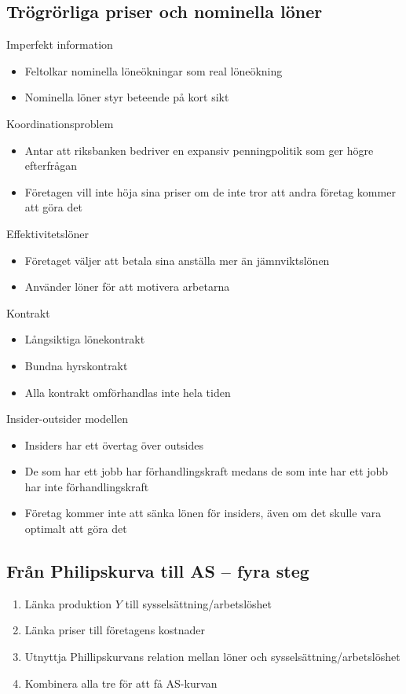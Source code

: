 \documentclass[12pt,a4paper]{article}
\begin{document}
\subsection{Trögrörliga priser och nominella löner}
Imperfekt information
\begin{itemize}
    \item Feltolkar nominella löneökningar som real löneökning
    \item Nominella löner styr beteende på kort sikt 
\end{itemize}

\noindent Koordinationsproblem
\begin{itemize}
    \item Antar att riksbanken bedriver en expansiv penningpolitik som ger högre efterfrågan 
    \item Företagen vill inte höja sina priser om de inte tror att andra företag kommer att göra det
\end{itemize}

\noindent Effektivitetslöner
\begin{itemize}
    \item Företaget väljer att betala sina anställa mer än jämnviktslönen 
    \item Använder löner för att motivera arbetarna
\end{itemize}

\noindent Kontrakt 
\begin{itemize}
    \item Långsiktiga lönekontrakt
    \item Bundna hyrskontrakt 
    \item Alla kontrakt omförhandlas inte hela tiden 
\end{itemize}

\noindent Insider-outsider modellen
\begin{itemize}
    \item Insiders har ett övertag över outsides
    \item De som har ett jobb har förhandlingskraft medans de som inte har ett jobb har inte förhandlingskraft
    \item Företag kommer inte att sänka lönen för insiders, även om det skulle vara optimalt att göra det
\end{itemize}

\subsection{Från Philipskurva till AS -- fyra steg}
\begin{enumerate}
    \item Länka produktion $Y$ till sysselsättning/arbetslöshet
    \item Länka priser till företagens kostnader
    \item Utnyttja Phillipskurvans relation mellan löner och sysselsättning/arbetslöshet    
    \item Kombinera alla tre för att få AS-kurvan
\end{enumerate}
\newpage
\end{document}
